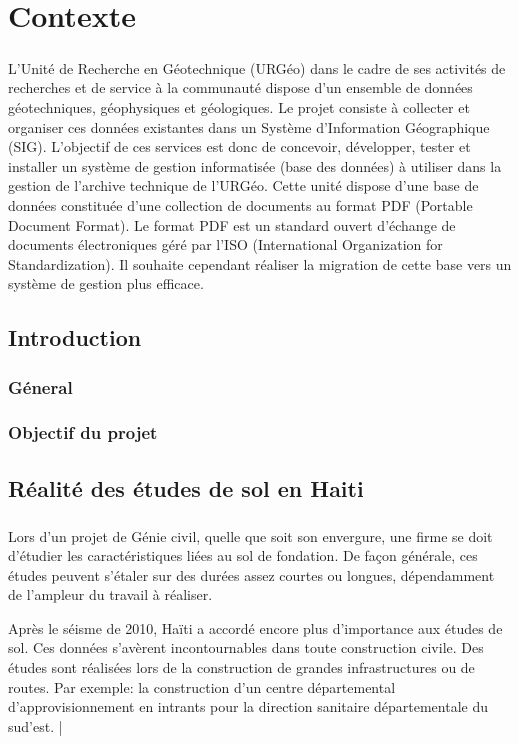 \chapter{Contexte}
\paragraph{}
L’Unité de Recherche en Géotechnique (URGéo) dans le cadre de ses activités de recherches et de service à
la communauté dispose d’un ensemble de données géotechniques, géophysiques et géologiques. Le projet
consiste à collecter et organiser ces données existantes dans un Système d’Information Géographique (SIG).
L’objectif de ces services est donc de concevoir, développer, tester et installer un système de gestion
informatisée (base des données) à utiliser dans la gestion de l’archive technique de l’URGéo. Cette unité
dispose d'une base de données constituée d’une collection de documents au format PDF (Portable Document
Format). Le format PDF est un standard ouvert d'échange de documents électroniques géré par l’ISO
(International Organization for Standardization). Il souhaite cependant réaliser la migration de cette base vers
un système de gestion plus efficace.
    \section{Introduction}
        \subsection{Géneral}
        \lipsum[1]
        \subsection{Objectif du projet}
        \lipsum[1]
    \section{Réalité des études de sol en Haiti}
    \paragraph{}
    Lors d'un projet de Génie civil, quelle que soit son envergure, une firme se doit d'étudier 
    les caractéristiques liées au sol de fondation. De façon générale, ces études peuvent s'étaler 
    sur des durées assez courtes ou longues, dépendamment de l'ampleur du travail à réaliser.
    \par
    Après le séisme de 2010, Haïti a accordé encore plus d'importance aux études de sol. Ces données s'avèrent 
    incontournables dans toute construction civile. Des études sont réalisées lors de la construction de grandes infrastructures ou de routes.
    Par exemple: la construction d'un centre départemental d'approvisionnement en intrants pour la direction sanitaire 
    départementale du sud'est. \cite{realisation_geotechsol} |
    


